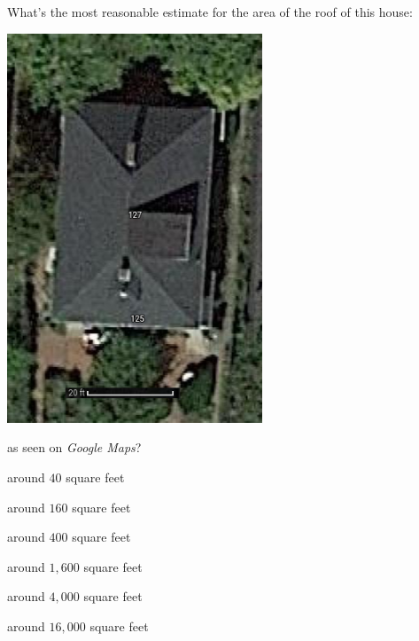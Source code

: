 \documentclass[noauthor,nooutcomes]{ximera}
\begin{document}
\begin{exercise}
  What's the most reasonable estimate for the area of the roof of this
  house:
  \begin{center}
    \includegraphics[width=3in]{mapsHouse.png}
  \end{center}
  as seen on \textit{Google Maps}?
  \begin{enumerate}\begin{multicols}{2}
    \item around $40$ square feet
    \item around $160$ square feet
    \item around $400$ square feet
    \item around $1,600$ square feet %
    \item around $4,000$ square feet
    \item around $16,000$ square feet
    \end{multicols}
  \end{enumerate}
\end{exercise}
\end{document}
